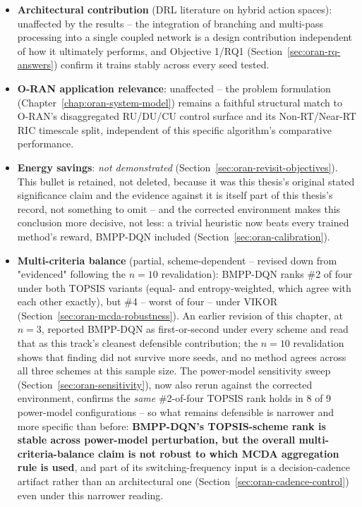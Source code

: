 \begin{itemize}
  \item \textbf{Architectural contribution} (DRL literature on hybrid
    action spaces): unaffected by the results -- the integration of
    branching and multi-pass processing into a single coupled network is a
    design contribution independent of how it ultimately performs, and
    Objective 1/RQ1 (Section~\ref{sec:oran-rq-answers}) confirm it trains
    stably across every seed tested.
  \item \textbf{O-RAN application relevance}: unaffected -- the problem
    formulation (Chapter~\ref{chap:oran-system-model}) remains a faithful
    structural match to O-RAN's disaggregated RU/DU/CU control surface and
    its Non-RT/Near-RT RIC timescale split, independent of this specific
    algorithm's comparative performance.
  \item \textbf{Energy savings}: \emph{not demonstrated}
    (Section~\ref{sec:oran-revisit-objectives}). This bullet is retained,
    not deleted, because it was this thesis's original stated significance
    claim and the evidence against it is itself part of this thesis's
    record, not something to omit -- and the corrected environment makes
    this conclusion more decisive, not less: a trivial heuristic now beats
    every trained method's reward, BMPP-DQN included
    (Section~\ref{sec:oran-calibration}).
  \item \textbf{Multi-criteria balance} (partial, scheme-dependent --
    revised down from "evidenced" following the $n=10$ revalidation):
    BMPP-DQN ranks \#2 of four under both TOPSIS variants (equal- and
    entropy-weighted, which agree with each other exactly), but \#4 --
    worst of four -- under VIKOR (Section~\ref{sec:oran-mcda-robustness}).
    An earlier revision of this chapter, at $n=3$, reported BMPP-DQN as
    first-or-second under every scheme and read that as this track's
    cleanest defensible contribution; the $n=10$ revalidation shows that
    finding did not survive more seeds, and no method agrees across all
    three schemes at this sample size. The power-model sensitivity sweep
    (Section~\ref{sec:oran-sensitivity}), now also rerun against the
    corrected environment, confirms the \emph{same} \#2-of-four TOPSIS
    rank holds in 8 of 9 power-model configurations -- so what remains
    defensible is narrower and more specific than before:
    \textbf{BMPP-DQN's TOPSIS-scheme rank is stable across power-model
    perturbation, but the overall multi-criteria-balance claim is not
    robust to which MCDA aggregation rule is used}, and part of its
    switching-frequency input is a decision-cadence artifact rather than
    an architectural one (Section~\ref{sec:oran-cadence-control}) even
    under this narrower reading.
\end{itemize}

